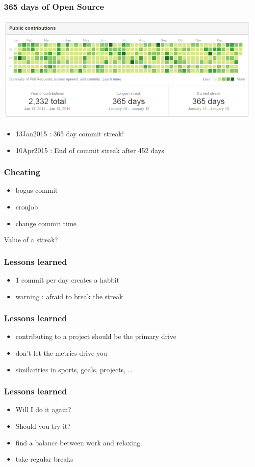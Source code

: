 \documentclass[14pt]{beamer}
\begin{document}
  \begin{frame}
    \frametitle{365 days of Open Source}
    \includegraphics[scale=.45]{github_oss365_13jan2015.png}
    \begin{itemize}
      \item 13Jan2015 : 365 day commit streak!
      \item 10Apr2015 : End of commit streak after 452 days
    \end{itemize}
  \end{frame}
  \begin{frame}
    \frametitle{Cheating}
    \begin{itemize}
      \item bogus commit
      \item cronjob
      \item change commit time
    \end{itemize}
    Value of a streak?
  \end{frame}
  \begin{frame}
    \frametitle{Lessons learned}
    \begin{itemize}
      \item 1 commit per day creates a habbit
      \item warning : afraid to break the streak
    \end{itemize}
  \end{frame}
  \begin{frame}
    \frametitle{Lessons learned}
    \begin{itemize}
      \item contributing to a project should be the primary drive
      \item don't let the metrics drive you
      \item similarities in sports, goals, projects, \ldots
    \end{itemize}
  \end{frame}
  \begin{frame}
    \frametitle{Lessons learned}
    \begin{itemize}
      \item Will I do it again?
      \item Should you try it?
      \item find a balance between work and relaxing
      \item take regular breaks
    \end{itemize}
  \end{frame}
\end{document}
